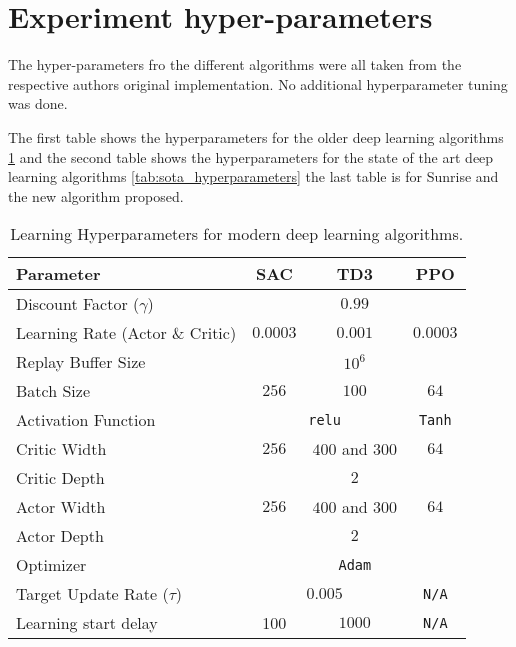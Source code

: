 \section{Experiment hyper-parameters}

The hyper-parameters fro the different algorithms were all taken from the respective authors original implementation. No additional hyperparameter tuning was done.

The first table shows the hyperparameters for the older deep learning algorithms \ref{tab:old_hyperparameters} and the second table shows the hyperparameters for the state of the art deep learning algorithms \ref{tab:sota_hyperparameters} the last table is for Sunrise and the new algorithm proposed.

\begin{table}[H]
\centering
\caption{Learning Hyperparameters for modern deep learning algorithms.}
\label{tab:old_hyperparameters}
\begin{tabular}{l|c|c|c}
\toprule
\textbf{Parameter}                &  SAC  & TD3  & PPO \\
\midrule\midrule
Discount Factor ($\gamma$)        & \multicolumn{3}{c}{$0.99$}             \\ \midrule
Learning Rate (Actor \& Critic)   & $0.0003$ & $0.001$ & $0.0003$\\ \midrule
Replay Buffer Size                & \multicolumn{3}{c}{$10^6$}             \\\midrule
Batch Size                        & $256$ & $100$ & $64$      \\\midrule
Activation Function               & \multicolumn{2}{c|}{\texttt{relu}}  & \texttt{Tanh}   \\\midrule
Critic Width                      & $256$ & $400$ and $300$ & $64$      \\\midrule
Critic Depth                      & \multicolumn{3}{c}{$2$}      \\\midrule
Actor Width                       & $256$ & $400$ and $300$ & $64$   \\\midrule
Actor Depth                       & \multicolumn{3}{c}{$2$}    \\\midrule
Optimizer                         & \multicolumn{3}{c}{\texttt{Adam}}     \\\midrule
Target Update Rate ($\tau$)       & \multicolumn{2}{c|}{$0.005$} & \texttt{N/A}       \\\midrule
Learning start delay              & 100 & $1000$ & \texttt{N/A}  \\\midrule

\end{tabular}
\end{table}
